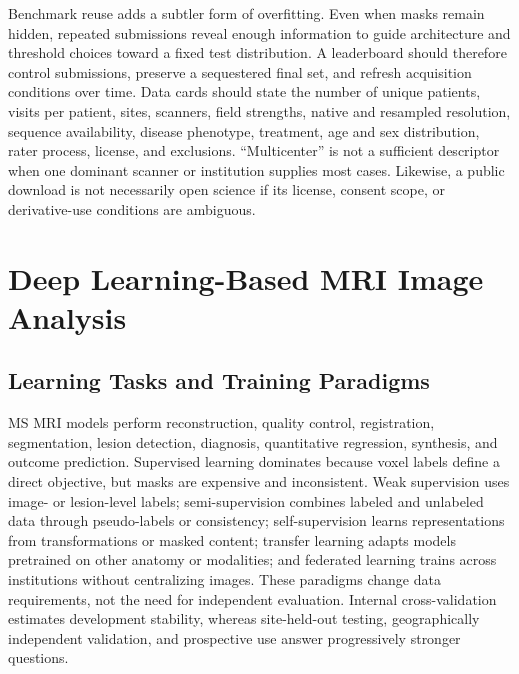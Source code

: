 \documentclass[journal,twoside,web]{ieeecolor}
\begin{document}
Benchmark reuse adds a subtler form of overfitting. Even when masks remain hidden, repeated submissions reveal enough information to guide architecture and threshold choices toward a fixed test distribution. A leaderboard should therefore control submissions, preserve a sequestered final set, and refresh acquisition conditions over time. Data cards should state the number of unique patients, visits per patient, sites, scanners, field strengths, native and resampled resolution, sequence availability, disease phenotype, treatment, age and sex distribution, rater process, license, and exclusions. ``Multicenter'' is not a sufficient descriptor when one dominant scanner or institution supplies most cases. Likewise, a public download is not necessarily open science if its license, consent scope, or derivative-use conditions are ambiguous.


\FloatBarrier

\section{Deep Learning-Based MRI Image Analysis}\label{sec:deep-learning-based-mri-image-analysis}

\subsection{Learning Tasks and Training Paradigms}\label{subsec:learning-tasks-and-training-paradigms}

MS MRI models perform reconstruction, quality control, registration, segmentation, lesion detection, diagnosis, quantitative regression, synthesis, and outcome prediction. Supervised learning dominates because voxel labels define a direct objective, but masks are expensive and inconsistent. Weak supervision uses image- or lesion-level labels; semi-supervision combines labeled and unlabeled data through pseudo-labels or consistency; self-supervision learns representations from transformations or masked content; transfer learning adapts models pretrained on other anatomy or modalities; and federated learning trains across institutions without centralizing images. These paradigms change data requirements, not the need for independent evaluation. Internal cross-validation estimates development stability, whereas site-held-out testing, geographically independent validation, and prospective use answer progressively stronger questions.
\end{document}
